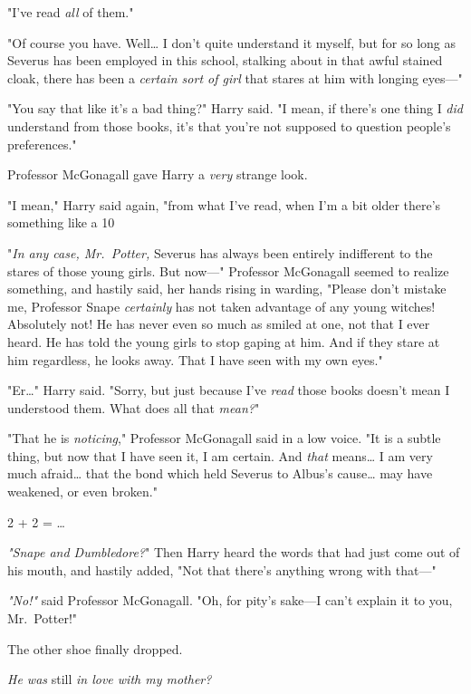 "I've read \emph{all} of them."

"Of course you have. Well{\ldots} I don't quite understand it myself, but for so long as Severus has been employed in this school, stalking about in that awful stained cloak, there has been a \emph{certain sort of girl} that stares at him with longing eyes---"

"You say that like it's a bad thing?" Harry said. "I mean, if there's one thing I \emph{did} understand from those books, it's that you're not supposed to question people's preferences."

Professor McGonagall gave Harry a \emph{very} strange look.

"I mean," Harry said again, "from what I've read, when I'm a bit older there's something like a 10%

"\emph{In any case, Mr.~Potter,} Severus has always been entirely indifferent to the stares of those young girls. But now---" Professor McGonagall seemed to realize something, and hastily said, her hands rising in warding, "Please don't mistake me, Professor Snape \emph{certainly} has not taken advantage of any young witches! Absolutely not! He has never even so much as smiled at one, not that I ever heard. He has told the young girls to stop gaping at him. And if they stare at him regardless, he looks away. That I have seen with my own eyes."

"Er{\ldots}" Harry said. "Sorry, but just because I've \emph{read} those books doesn't mean I understood them. What does all that \emph{mean?}"

"That he is \emph{noticing}," Professor McGonagall said in a low voice. "It is a subtle thing, but now that I have seen it, I am certain. And \emph{that} means{\ldots} I am very much afraid{\ldots} that the bond which held Severus to Albus's cause{\ldots} may have weakened, or even broken."

2 + 2 = {\ldots}

\emph{"Snape and Dumbledore?}" Then Harry heard the words that had just come out of his mouth, and hastily added, "Not that there's anything wrong with that---"

\emph{"No!"} said Professor McGonagall. "Oh, for pity's sake---I can't explain it to you, Mr.~Potter!"

The other shoe finally dropped.

\emph{He was} still\emph{ in love with my mother?}

